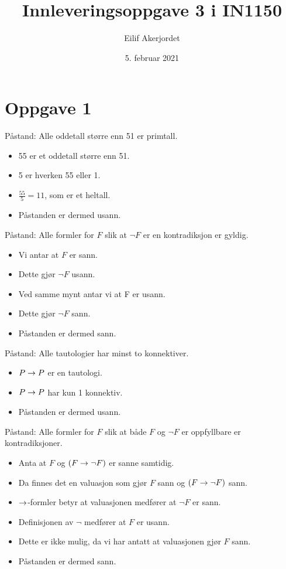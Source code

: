 \documentclass{in1150-innlevering}
\title{Innleveringsoppgave 3 i IN1150}
\author{Eilif Akerjordet}
\date{5. februar 2021}
\begin{document}
\maketitle

\section*{Oppgave 1}
\begin{deloppgaver}
    \item
        Påstand: Alle oddetall større enn 51 er primtall.
        \begin{itemize}
            \item 55 er et oddetall større enn 51.
            \item 5 er hverken 55 eller 1.
            \item $\frac{55}{5} = 11$, som er et heltall.
            \item Påstanden er dermed usann.
        \end{itemize}
    \item
        Påstand: Alle formler for $F$ slik at $\neg F$ er en kontradiksjon er gyldig.
        \begin{itemize}
            \item Vi antar at $F$ er sann.
            \item Dette gjør $\neg F$ usann.
            \item Ved samme mynt antar vi at F er usann.
            \item Dette gjør $\neg F$ sann.
            \item Påstanden er dermed sann.
        \end{itemize}
    \item
        Påstand: Alle tautologier har minst to konnektiver.
        \begin{itemize}
            \item $P \mathrel{\rightarrow} P$ er en tautologi.
            \item $P \mathrel{\rightarrow} P$ har kun 1 konnektiv.
            \item Påstanden er dermed usann.
        \end{itemize}
    \item
        Påstand: Alle formler for $F$ slik at både $F$ og $\neg F$ er oppfyllbare er kontradiksjoner.
        \begin{itemize}
            \item Anta at $F$ og $(F \mathrel{\rightarrow} \neg F)$ er sanne samtidig.
            \item Da finnes det en valuasjon som gjør $F$ sann og $(F \mathrel{\rightarrow} \neg F)$ sann.
            \item $\mathrel{\rightarrow}$-formler betyr at valuasjonen medfører at $\neg F$ er sann.
            \item Definisjonen av $\neg$ medfører at $F$ er usann.
            \item Dette er ikke mulig, da vi har antatt at valuasjonen gjør $F$ sann.
            \item Påstanden er dermed sann.
        \end{itemize}
\end{deloppgaver}
\end{document}
